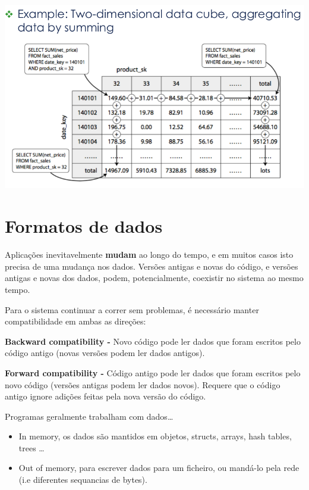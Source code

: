 \documentclass{article}
\begin{document}
\begin{center}
  \includegraphics[scale=0.3]{53}
\end{center}

\section{Formatos de dados}

Aplicações inevitavelmente \textbf{mudam} ao longo do tempo, e em muitos casos
isto precisa de uma mudança nos dados.
Versões antigas e novas do código, e versões antigas e novas dos dados,
podem, potencialmente, coexistir no sistema ao mesmo tempo.

Para o sistema continuar a correr sem problemas, é necessário
manter compatibilidade em ambas as direções:

\begin{flushleft}
  \textbf{Backward compatibility -} Novo código pode ler dados que foram escritos
  pelo código antigo (novas versões podem ler dados antigos).

  \textbf{Forward compatibility -} Código antigo pode ler dados que foram escritos
  pelo novo código (versões antigas podem ler dados novos). Requere que o código antigo
  ignore adições feitas pela nova versão do código.
\end{flushleft}

Programas geralmente trabalham com dados\dots
\begin{itemize}
  \item In memory, os dados são mantidos em objetos, structs, arrays, hash tables, trees \dots
  \item Out of memory, para escrever dados para um ficheiro, ou mandá-lo pela rede
  (i.e diferentes sequancias de bytes).
\end{itemize}
\end{document}
